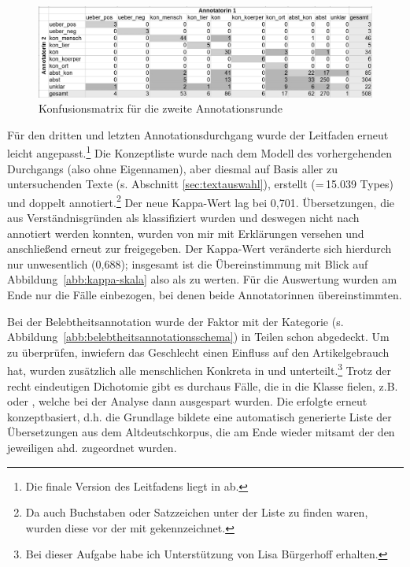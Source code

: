 \begin{figure}
\begin{center}
  \includegraphics[width=\textwidth]{images/confusionsmatrix-neu-sw.jpg}
\caption {Konfusionsmatrix für die zweite Annotationsrunde}
\label{abb:confusion}
\end{center}
\end{figure} 

Für den dritten und letzten Annotationsdurchgang  wurde der Leitfaden erneut leicht angepasst.\footnote{Die finale Version des Leitfadens liegt in \textcite{HZKYL4_2020} ab.} Die Konzeptliste wurde nach dem Modell des vorhergehenden Durchgangs (also ohne  Eigennamen), aber diesmal auf Basis aller zu untersuchenden Texte (s. Abschnitt \ref{sec:textauswahl}), erstellt (=\,15.039 Types)  und doppelt  annotiert.\footnote{Da auch Buchstaben oder Satzzeichen unter der Liste zu finden waren, wurden diese vor der  mit  gekennzeichnet.} Der neue Kappa-Wert lag bei 0,701. Übersetzungen, die aus Verständnisgründen als  klassifiziert wurden und deswegen nicht nach  annotiert  werden konnten, wurden von mir mit Erklärungen versehen und anschließend erneut zur  freigegeben. Der Kappa-Wert veränderte sich hierdurch nur unwesentlich (0,688); insgesamt ist die Übereinstimmung mit Blick auf Abbildung~\ref{abb:kappa-skala} also als   zu werten. Für die Auswertung wurden am Ende nur die Fälle einbezogen, bei denen beide Annotatorinnen übereinstimmten.


Bei der Belebtheitsannotation wurde der Faktor  mit der Kategorie  (s. Abbildung~\ref{abb:belebtheitsannotationsschema}) in Teilen schon abgedeckt. Um zu überprüfen, inwiefern das Geschlecht einen Einfluss auf den Artikelgebrauch hat, wurden zusätzlich alle menschlichen Konkreta  in  und  unterteilt.\footnote{Bei dieser Aufgabe habe ich Unterstützung von Lisa Bürgerhoff erhalten.} 
Trotz der recht eindeutigen Dichotomie gibt es durchaus Fälle, die in die Klasse  fielen, z.B.  oder , welche bei der Analyse dann ausgespart wurden.  Die  erfolgte erneut konzeptbasiert, d.h. die Grundlage bildete eine automatisch generierte Liste der  Übersetzungen aus dem  Altdeutschkorpus, die am Ende wieder mitsamt der  den jeweiligen ahd.  zugeordnet wurden.\largerpage


